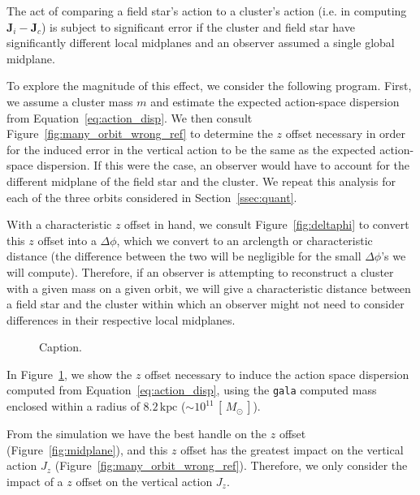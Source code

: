\documentclass[twocolumn]{aastex62}
\newcommand{\kpc}{\text{kpc}}
\begin{document}
The act of comparing a field star's action to a cluster's action (i.e. in
computing $\bm{J}_i - \bm{J}_c$) is subject to significant error if the
cluster and field star have significantly different local midplanes and an
observer assumed a single global midplane.

To explore the magnitude of this effect, we consider the following program.
First, we assume a cluster mass $m$ and estimate the expected action-space
dispersion from Equation~\ref{eq:action_disp}. We then consult
Figure~\ref{fig:many_orbit_wrong_ref} to determine the $z$ offset necessary in
order for the induced error in the vertical action to be the same as the
expected action-space dispersion. If this were the case, an observer would
have to account for the different midplane of the field star and the cluster.
We repeat this analysis for each of the three orbits considered in
Section~\ref{ssec:quant}.

With a characteristic $z$ offset in hand, we consult Figure~\ref{fig:deltaphi}
to convert this $z$ offset into a $\Delta \phi$, which we convert to an
arclength or characteristic distance (the difference between the two will be
negligible for the small $\Delta \phi$'s we will compute). Therefore, if an
observer is attempting to reconstruct a cluster with a given mass on a given
orbit, we will give a characteristic distance between a field star and the
cluster within which an observer might not need to consider differences in
their respective local midplanes.

\begin{figure}
\caption{Caption.}
\label{fig:cluster_offset}
\end{figure}

In Figure~\ref{fig:cluster_offset}, we show the $z$ offset necessary to induce
the action space dispersion computed from Equation~\ref{eq:action_disp}, using
the \texttt{gala} computed mass enclosed within a radius of $8.2\,\kpc$ ($\sim
10^{11}\,[\,M_{\odot}\,]$). 

From the simulation we have the best handle on the $z$ offset
(Figure~\ref{fig:midplane}), and this $z$ offset has the greatest impact on
the vertical action $J_z$ (Figure~\ref{fig:many_orbit_wrong_ref}). Therefore,
we only consider the impact of a $z$ offset on the vertical action $J_z$.



\end{document}
